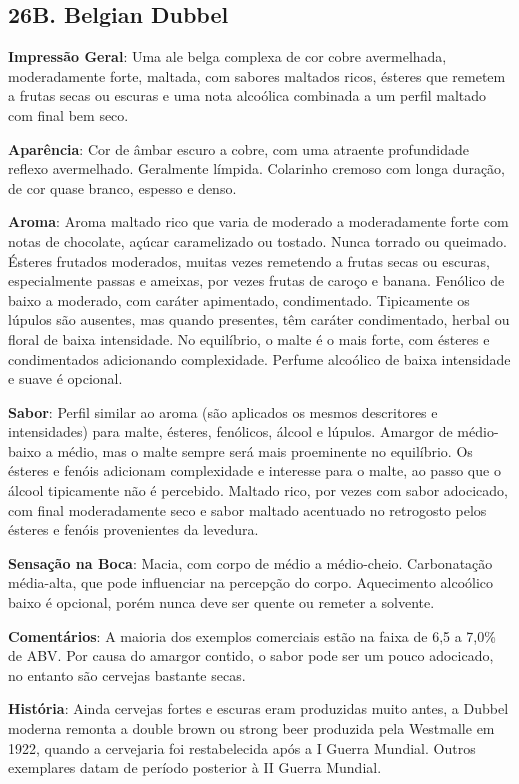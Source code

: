 \subsection*{26B. Belgian Dubbel}

\textbf{Impressão Geral}: Uma ale belga complexa de cor cobre avermelhada, moderadamente forte, maltada, com sabores maltados ricos, ésteres que remetem a frutas secas ou escuras e uma nota alcoólica combinada a um perfil maltado com final bem seco.

\textbf{Aparência}: Cor de âmbar escuro a cobre, com uma atraente profundidade reflexo avermelhado. Geralmente límpida. Colarinho cremoso com longa duração, de cor quase branco, espesso e denso.

\textbf{Aroma}: Aroma maltado rico que varia de moderado a moderadamente forte com notas de chocolate, açúcar caramelizado ou tostado. Nunca torrado ou queimado. Ésteres frutados moderados, muitas vezes remetendo a frutas secas ou escuras, especialmente passas e ameixas, por vezes frutas de caroço e banana. Fenólico de baixo a moderado, com caráter apimentado, condimentado. Tipicamente os lúpulos são ausentes, mas quando presentes, têm caráter condimentado, herbal ou floral de baixa intensidade. No equilíbrio, o malte é o mais forte, com ésteres e condimentados adicionando complexidade. Perfume alcoólico de baixa intensidade e suave é opcional.

\textbf{Sabor}: Perfil similar ao aroma (são aplicados os mesmos descritores e intensidades) para malte, ésteres, fenólicos, álcool e lúpulos. Amargor de médio-baixo a médio, mas o malte sempre será mais proeminente no equilíbrio. Os ésteres e fenóis adicionam complexidade e interesse para o malte, ao passo que o álcool tipicamente não é percebido. Maltado rico, por vezes com sabor adocicado, com final moderadamente seco e sabor maltado acentuado no retrogosto pelos ésteres e fenóis provenientes da levedura.

\textbf{Sensação na Boca}: Macia, com corpo de médio a médio-cheio. Carbonatação média-alta, que pode influenciar na percepção do corpo. Aquecimento alcoólico baixo é opcional, porém nunca deve ser quente ou remeter a solvente.

\textbf{Comentários}: A maioria dos exemplos comerciais estão na faixa de 6,5 a 7,0\% de ABV. Por causa do amargor contido, o sabor pode ser um pouco adocicado, no entanto são cervejas bastante secas.

\textbf{História}: Ainda cervejas fortes e escuras eram produzidas muito antes, a Dubbel moderna remonta a double brown ou strong beer produzida pela Westmalle em 1922, quando a cervejaria foi restabelecida após a I Guerra Mundial. Outros exemplares datam de período posterior à II Guerra Mundial.

